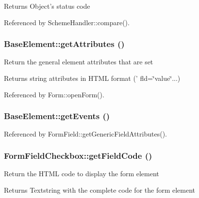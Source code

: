 \begin{DoxyReturn}{Returns}
Object's status code 
\end{DoxyReturn}


Referenced by SchemeHandler::compare().

\subsubsection[{getAttributes}]{\setlength{\rightskip}{0pt plus 5cm}BaseElement::getAttributes ()}\label{classBaseElement_a25bed980efe965e95dc43d7c2fa1faca}
Return the general element attributes that are set \begin{DoxyReturn}{Returns}
string attributes in HTML format (' fld=\char`\"{}value\char`\"{}...) 
\end{DoxyReturn}


Referenced by Form::openForm().

\subsubsection[{getEvents}]{\setlength{\rightskip}{0pt plus 5cm}BaseElement::getEvents ()}\label{classBaseElement_a852277a83d867417f2e39e8a2483bac7}


Referenced by FormField::getGenericFieldAttributes().

\subsubsection[{getFieldCode}]{\setlength{\rightskip}{0pt plus 5cm}FormFieldCheckbox::getFieldCode ()}\label{classFormFieldCheckbox_aaa7647c07d938553d8bec7afa869ebc0}
Return the HTML code to display the form element

\begin{DoxyReturn}{Returns}
Textstring with the complete code for the form element 
\end{DoxyReturn}


